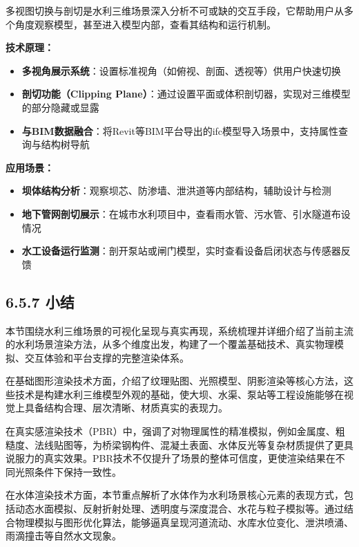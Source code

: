 多视图切换与剖切是水利三维场景深入分析不可或缺的交互手段，它帮助用户从多个角度观察模型，甚至进入模型内部，查看其结构和运行机制。

\textbf{技术原理：}

\begin{itemize}
\tightlist
\item
  \textbf{多视角展示系统}：设置标准视角（如俯视、剖面、透视等）供用户快速切换
\item
  \textbf{剖切功能（Clipping
  Plane）}：通过设置平面或体积剖切器，实现对三维模型的部分隐藏或显露
\item
  \textbf{与BIM数据融合}：将Revit等BIM平台导出的ifc模型导入场景中，支持属性查询与结构树导航
\end{itemize}

\textbf{应用场景：}

\begin{itemize}
\tightlist
\item
  \textbf{坝体结构分析}：观察坝芯、防渗墙、泄洪道等内部结构，辅助设计与检测
\item
  \textbf{地下管网剖切展示}：在城市水利项目中，查看雨水管、污水管、引水隧道布设情况
\item
  \textbf{水工设备运行监测}：剖开泵站或闸门模型，实时查看设备启闭状态与传感器反馈
\end{itemize}

\subsection{6.5.7 小结}\label{ux5c0fux7ed3}

本节围绕水利三维场景的可视化呈现与真实再现，系统梳理并详细介绍了当前主流的水利场景渲染方法，从多个维度出发，构建了一个覆盖基础技术、真实物理模拟、交互体验和平台支撑的完整渲染体系。

在基础图形渲染技术方面，介绍了纹理贴图、光照模型、阴影渲染等核心方法，这些技术是构建水利三维模型外观的基础，使大坝、水渠、泵站等工程设施能够在视觉上具备结构合理、层次清晰、材质真实的表现力。

在真实感渲染技术（PBR）中，强调了对物理属性的精准模拟，例如金属度、粗糙度、法线贴图等，为桥梁钢构件、混凝土表面、水体反光等复杂材质提供了更具说服力的真实效果。PBR技术不仅提升了场景的整体可信度，更使渲染结果在不同光照条件下保持一致性。

在水体渲染技术方面，本节重点解析了水体作为水利场景核心元素的表现方式，包括动态水面模拟、反射折射处理、透明度与深度混合、水花与粒子模拟等。通过结合物理模拟与图形优化算法，能够逼真呈现河道流动、水库水位变化、泄洪喷涌、雨滴撞击等自然水文现象。

